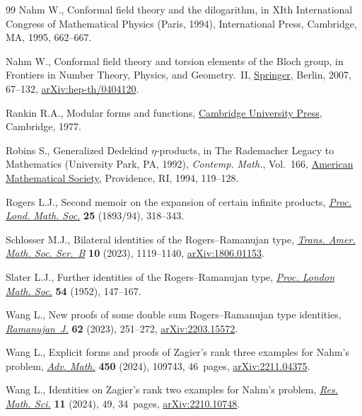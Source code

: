 \begin{thebibliography}{99}
Nahm W., Conformal field theory and the dilogarithm, in X{I}th {I}nternational
 {C}ongress of {M}athematical {P}hysics ({P}aris, 1994), International Press,
 Cambridge, MA, 1995, 662--667.

Nahm W., Conformal field theory and torsion elements of the {B}loch group, in
 Frontiers in Number Theory, Physics, and Geometry.~{II},
 \href{https://doi.org/10.1007/978-3-540-30308-4_2}{Springer}, Berlin, 2007,
 67--132, \href{http://arxiv.org/abs/hep-th/0404120}{arXiv:hep-th/0404120}.

Rankin R.A., Modular forms and functions,
 \href{https://doi.org/10.1017/CBO9780511566035}{Cambridge University Press},
 Cambridge, 1977.

Robins S., Generalized {D}edekind {$\eta$}-products, in The {R}ademacher Legacy
 to Mathematics ({U}niversity {P}ark, {PA}, 1992), \textit{Contemp. Math.},
 Vol.~166, \href{https://doi.org/10.1090/conm/166/01645}{American Mathematical
 Society}, Providence, RI, 1994, 119--128.

Rogers L.J., Second memoir on the expansion of certain infinite products, \href{https://doi.org/10.1112/plms/s1-25.1.318}{\textit{Proc.
 Lond. Math. Soc.}} \textbf{25} (1893/94), 318--343.

Schlosser M.J., Bilateral identities of the {R}ogers--{R}amanujan type,
 \href{https://doi.org/10.1090/btran/158}{\textit{Trans. Amer. Math. Soc.
 Ser.~B}} \textbf{10} (2023), 1119--1140,
 \href{http://arxiv.org/abs/1806.01153}{arXiv:1806.01153}.

Slater L.J., Further identities of the {R}ogers--{R}amanujan type,
 \href{https://doi.org/10.1112/plms/s2-54.2.147}{\textit{Proc. London Math.
 Soc.}} \textbf{54} (1952), 147--167.

Wang L., New proofs of some double sum {R}ogers--{R}amanujan type identities,
 \href{https://doi.org/10.1007/s11139-022-00654-5}{\textit{Ramanujan~J.}}
 \textbf{62} (2023), 251--272,
 \href{http://arxiv.org/abs/2203.15572}{arXiv:2203.15572}.

Wang L., Explicit forms and proofs of {Z}agier's rank three examples for
 {N}ahm's problem,
 \href{https://doi.org/10.1016/j.aim.2024.109743}{\textit{Adv. Math.}}
 \textbf{450} (2024), 109743, 46~pages,
 \href{http://arxiv.org/abs/2211.04375}{arXiv:2211.04375}.

Wang L., Identities on {Z}agier's rank two examples for {N}ahm's problem,
 \href{https://doi.org/10.1007/s40687-024-00460-z}{\textit{Res. Math. Sci.}}
 \textbf{11} (2024), 49, 34~pages,
 \href{http://arxiv.org/abs/2210.10748}{arXiv:2210.10748}.


\end{thebibliography}
